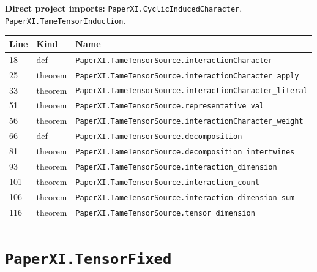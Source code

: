 \documentclass[10pt,oneside]{book}
\begin{document}

\textbf{Direct project imports:} \nolinkurl{PaperXI.CyclicInducedCharacter}, \nolinkurl{PaperXI.TameTensorInduction}.

\begin{longtable}{@{}p{}p{}p{}@{}}\toprule Line&Kind&Name\\\midrule\endhead

18&def&\nolinkurl{PaperXI.TameTensorSource.interactionCharacter}\\

25&theorem&\nolinkurl{PaperXI.TameTensorSource.interactionCharacter_apply}\\

33&theorem&\nolinkurl{PaperXI.TameTensorSource.interactionCharacter_literal}\\

51&theorem&\nolinkurl{PaperXI.TameTensorSource.representative_val}\\

56&theorem&\nolinkurl{PaperXI.TameTensorSource.interactionCharacter_weight}\\

66&def&\nolinkurl{PaperXI.TameTensorSource.decomposition}\\

81&theorem&\nolinkurl{PaperXI.TameTensorSource.decomposition_intertwines}\\

93&theorem&\nolinkurl{PaperXI.TameTensorSource.interaction_dimension}\\

101&theorem&\nolinkurl{PaperXI.TameTensorSource.interaction_count}\\

106&theorem&\nolinkurl{PaperXI.TameTensorSource.interaction_dimension_sum}\\

116&theorem&\nolinkurl{PaperXI.TameTensorSource.tensor_dimension}\\

\bottomrule\end{longtable}

\section{\texorpdfstring{\nolinkurl{PaperXI.TensorFixed}}{PaperXI.TensorFixed}}\label{module:PaperXI.TensorFixed}
\end{document}
